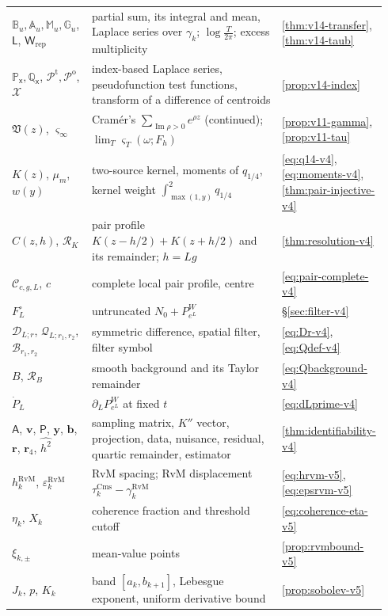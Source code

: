 \documentclass[11pt,a4paper]{article}
\numberwithin{equation}{section}
\theoremstyle{definition}
\theoremstyle{remark}
\newcommand{\Cms}{\mathrm{Cms}}
\begin{document}
\begin{longtable}{@{}p{0.22\linewidth}p{0.56\linewidth}p{0.16\linewidth}@{}}
$\mathbb B_u,\mathbb A_u,\mathbb M_u,\mathbb G_u$, $\mathsf L$, $\mathsf W_{\mathrm{rep}}$ & partial sum, its integral and mean, Laplace series over $\gamma_k$; $\log\frac T{2\pi}$; excess multiplicity & \cref{thm:v14-transfer}, \cref{thm:v14-taub}\\
$\mathbb P_{\mathsf x},\mathbb Q_{\mathsf x}$, $\mathscr P^{\mathrm t},\mathscr P^{\mathrm o}$, $\mathscr X$ & index-based Laplace series, pseudofunction test functions, transform of a difference of centroids & \cref{prop:v14-index}\\
$\mathfrak V(z)$, $\varsigma_\infty$ & Cram\'er's $\sum_{\operatorname{Im}\rho>0}e^{\rho z}$ (continued); $\lim_T\varsigma_T(\omega;F_h)$ & \cref{prop:v11-gamma}, \cref{prop:v11-tau}\\
$K(z)$, $\mu_m$, $w(y)$ & two-source kernel, moments of $q_{1/4}$, kernel weight $\int_{\max(1,y)}^2q_{1/4}$ & \eqref{eq:q14-v4}, \eqref{eq:moments-v4}, \cref{thm:pair-injective-v4}\\
$C(z,h)$, $\mathcal R_K$ & pair profile $K(z-h/2)+K(z+h/2)$ and its remainder; $h=Lg$ & \cref{thm:resolution-v4}\\
$\mathcal C_{c,g,L}$, $c$ & complete local pair profile, centre & \eqref{eq:pair-complete-v4}\\
$F_L^\circ$ & untruncated $N_0+P_{e^L}^W$ & \S\ref{sec:filter-v4}\\
$\mathscr D_{L;r}$, $\mathscr Q_{L;r_1,r_2}$, $\mathscr B_{r_1,r_2}$ & symmetric difference, spatial filter, filter symbol & \eqref{eq:Dr-v4}, \eqref{eq:Qdef-v4}\\
$B$, $\mathcal R_B$ & smooth background and its Taylor remainder & \eqref{eq:Qbackground-v4}\\
$\dot P_L$ & $\partial_LP_{e^L}^W$ at fixed $t$ & \eqref{eq:dLprime-v4}\\
$\mathsf A$, $\mathbf v$, $\mathsf P$, $\mathbf y$, $\mathbf b$, $\mathbf r$, $\mathbf r_4$, $\widehat{h^2}$ & sampling matrix, $K''$ vector, projection, data, nuisance, residual, quartic remainder, estimator & \cref{thm:identifiability-v4}\\
$h_k^{\mathrm{RvM}}$, $\varepsilon_k^{\mathrm{RvM}}$ & RvM spacing; RvM displacement $\tau_k^{\Cms}-\gamma_k^{\mathrm{RvM}}$ & \eqref{eq:hrvm-v5}, \eqref{eq:epsrvm-v5}\\
$\eta_k$, $X_k$ & coherence fraction and threshold cutoff & \eqref{eq:coherence-eta-v5}\\
$\xi_{k,\pm}$ & mean-value points & \cref{prop:rvmbound-v5}\\
$J_k$, $p$, $K_k$ & band $[a_k,b_{k+1}]$, Lebesgue exponent, uniform derivative bound & \cref{prop:sobolev-v5}\\

\end{longtable}
\end{document}

